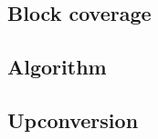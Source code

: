 

\providecommand{\pic}[0]{\text{\texttt{pic}}}
\providecommand{\block}[0]{\text{\texttt{block}}}
\providecommand{\refs}[0]{\text{\texttt{refs}}}
\providecommand{\mcparams}[0]{\text{\texttt{mc\_params}}}
\providecommand{\mcfunc}[0]{\text{\texttt{motion\_compensate()}}}
\providecommand{\compmc}[0]{\text{\texttt{component\_compensate()}}}

\providecommand{\URef}[0]{\mathfrak{R}}
\providecommand{\picWidth}[0]{\text{\texttt{pic\_width}}}
\providecommand{\picHeight}[0]{\text{\texttt{pic\_height}}}
\providecommand{\W}[0]{\text{\texttt{W}}}
\providecommand{\xblen}[0]{\text{\texttt{xblen}}}
\providecommand{\yblen}[0]{\text{\texttt{yblen}}}
\providecommand{\xbsep}[0]{\text{\texttt{xbsep}}}
\providecommand{\ybsep}[0]{\text{\texttt{ybsep}}}
\providecommand{\gmA}[0]{\pmb{\text{A}}}
\providecommand{\gmB}[0]{\pmb{\text{b}}}
\providecommand{\gmC}[0]{\pmb{\text{c}}}
\providecommand{\B}[0]{\text{\texttt{b}}}
\providecommand{\Bx}[0]{\text{\texttt{b.x}}}
\providecommand{\By}[0]{\text{\texttt{b.y}}}
\providecommand{\Bpredmode}[0]{\text{\texttt{b.predmode}}}
\providecommand{\predIntra}[0]{\text{Intra}}
\providecommand{\predInter}[0]{\text{Inter}}
\providecommand{\predGlobal}[0]{\text{Global}}
\providecommand{\Brefsinuse}[0]{\text{\texttt{b.refsinuse}}}
\providecommand{\Bdc}[0]{\text{\texttt{b.dc}}}
\providecommand{\Bv}[0]{\text{\texttt{b.v}}}




\subsection{Block coverage}
\subsection{Algorithm}
\subsection{Upconversion}
